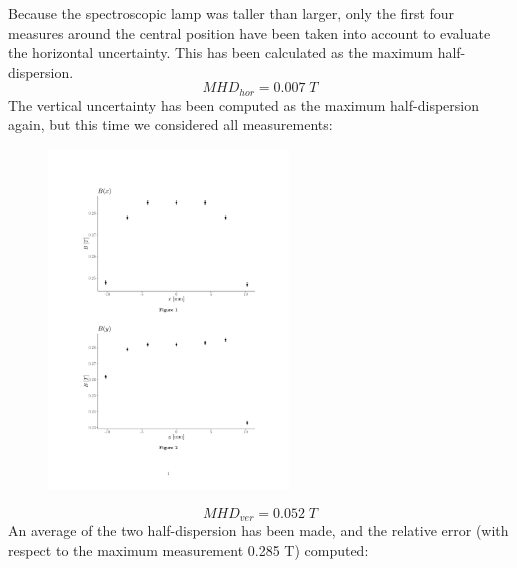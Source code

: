 \documentclass[a4paper,12pt,abstracton]{scrartcl}
\begin{document}
Because the spectroscopic lamp was taller than larger, only the first four measures around the central position have been taken into account to evaluate the horizontal uncertainty. This has been calculated as the maximum half-dispersion.$$MHD_{hor}=0.007 \; T$$
The vertical uncertainty has been computed as the maximum half-dispersion again, but this time we considered all measurements:
\begin{table}[H]
\centering
\caption{}
\label{disY}
\end{table}

\begin{figure}[H]
\begin{center}
\includegraphics[trim=3cm 4cm 3cm 15cm, clip,height=9cm,keepaspectratio]{MagneticDishomogeneity.pdf}
\end{center}
\end{figure}
$$MHD_{ver}=0.052 \; T$$
An average of the two half-dispersion has been made, and the relative error (with respect to the maximum measurement 0.285 T) computed:
\end{document}
